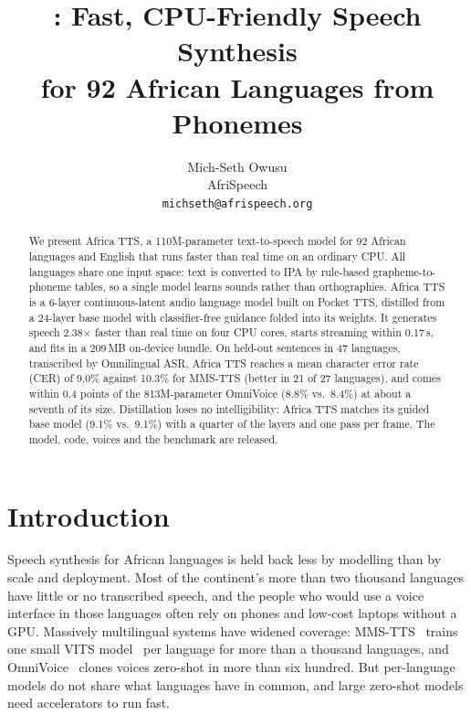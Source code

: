 \documentclass[10pt,twocolumn]{article}
\title{\att{}: Fast, CPU-Friendly Speech Synthesis\\for 92 African Languages from Phonemes}
\author{%
Mich-Seth Owusu\\[2pt]
\normalsize AfriSpeech\\
\normalsize\texttt{michseth@afrispeech.org}
}
\date{}
\newcommand{\att}{Africa TTS}
\newcommand{\nTrainedLangs}{47}
\newcommand{\distturbo}{9.1}
\newcommand{\distguided}{9.1}
\newcommand{\turboBeatsMms}{21 of 27}
\newcommand{\avgMmsturbo}{9.0}
\newcommand{\avgMmsMms}{10.3}
\newcommand{\avgOmniturbo}{8.8}
\newcommand{\avgOmniOmni}{8.4}
\newcommand{\xrtturbopython}{2.38}
\newcommand{\ttfaturbopython}{0.17}
\begin{document}
\maketitle

\begin{abstract}
We present \att{}, a 110M-parameter text-to-speech model for 92 African languages and English
that runs faster than real time on an ordinary CPU. All languages share one input space: text is
converted to IPA by rule-based grapheme-to-phoneme tables, so a single model learns sounds rather
than orthographies. \att{} is a 6-layer continuous-latent audio language model built on Pocket
TTS, distilled from a 24-layer base model with classifier-free guidance folded into its weights.
It generates speech \xrtturbopython{}$\times$ faster than real time on four CPU cores, starts
streaming within \ttfaturbopython{}\,s, and fits in a 209\,MB on-device bundle. On held-out
sentences in \nTrainedLangs{} languages, transcribed by Omnilingual ASR, \att{} reaches a mean
character error rate (CER) of \avgMmsturbo{}\% against \avgMmsMms{}\% for MMS-TTS (better in
\turboBeatsMms{} languages), and comes within 0.4 points of the 813M-parameter OmniVoice
(\avgOmniturbo{}\% vs.\ \avgOmniOmni{}\%) at about a seventh of its size. Distillation loses no
intelligibility: \att{} matches its guided base model (\distturbo{}\% vs.\ \distguided{}\%) with
a quarter of the layers and one pass per frame. The model, code, voices and the benchmark are
released.
\end{abstract}

\section{Introduction}

Speech synthesis for African languages is held back less by modelling than by scale and
deployment. Most of the continent's more than two thousand languages have little or no
transcribed speech, and the people who would use a voice interface in those languages often
rely on phones and low-cost laptops without a GPU. Massively multilingual systems have widened
coverage: MMS-TTS~\cite{pratap2023mms} trains one small VITS model~\cite{kim2021vits} per
language for more than a thousand languages, and OmniVoice~\cite{zhu2026omnivoice} clones voices
zero-shot in more than six hundred. But per-language models do not share what languages have in
common, and large zero-shot models need accelerators to run fast.
\end{document}
